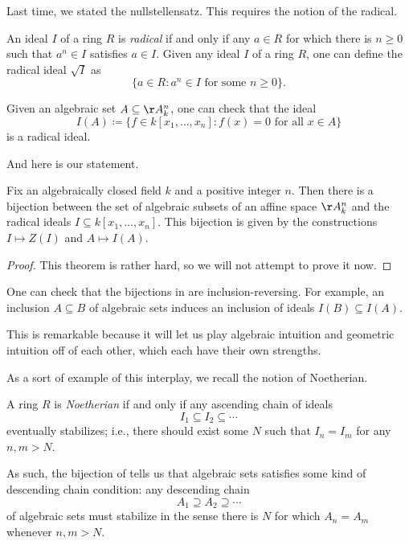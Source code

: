 \documentclass[../notes.tex]{subfiles}
\begin{document}
Last time, we stated the nullstellensatz. This requires the notion of the radical.
\begin{definition}[radical]
	An ideal $I$ of a ring $R$ is \textit{radical} if and only if any $a\in R$ for which there is $n\ge0$ such that $a^n\in I$ satisfies $a\in I$. Given any ideal $I$ of a ring $R$, one can define the radical ideal $\sqrt I$ as
	\[\{a\in R:a^n\in I\text{ for some }n\ge0\}.\]
\end{definition}
\begin{example}
	Given an algebraic set $A\subseteq\AA^n_k$, one can check that the ideal
	\[I(A)\coloneqq\{f\in k[x_1,\ldots,x_n]:f(x)=0\text{ for all }x\in A\}\]
	is a radical ideal.
\end{example}
And here is our statement.
\begin{theorem}[Nullstellensatz] \label{thm:nullstellensatz}
	Fix an algebraically closed field $k$ and a positive integer $n$. Then there is a bijection between the set of algebraic subsets of an affine space $\AA^n_k$ and the radical ideals $I\subseteq k[x_1,\ldots,x_n]$. This bijection is given by the constructions $I\mapsto Z(I)$ and $A\mapsto I(A)$.
\end{theorem}
\begin{proof}
	This theorem is rather hard, so we will not attempt to prove it now.
\end{proof}
\begin{remark}
	One can check that the bijections in  are inclusion-reversing. For example, an inclusion $A\subseteq B$ of algebraic sets induces an inclusion of ideals $I(B)\subseteq I(A)$.
\end{remark}
This is remarkable because it will let us play algebraic intuition and geometric intuition off of each other, which each have their own strengths.

As a sort of example of this interplay, we recall the notion of Noetherian.
\begin{definition}[Noetherian]
	A ring $R$ is \textit{Noetherian} if and only if any ascending chain of ideals
	\[I_1\subseteq I_2\subseteq\cdots\]
	eventually stabilizes; i.e., there should exist some $N$ such that $I_n=I_m$ for any $n,m>N$.
\end{definition}
As such, the bijection of  tells us that algebraic sets satisfies some kind of descending chain condition: any descending chain
\[A_1\supseteq A_2\supseteq\cdots\]
of algebraic sets must stabilize in the sense there is $N$ for which $A_n=A_m$ whenever $n,m>N$.
\end{document}
